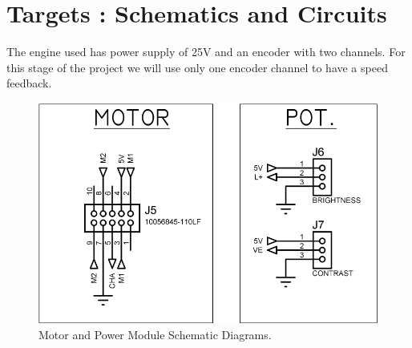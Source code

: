\documentclass[journal]{IEEEtran}
\begin{document}




\section{Targets : Schematics and Circuits}


The engine used \cite{IEEEhowto:motor} has power supply of 25V and an encoder with two channels. For this stage of the project we will use only one encoder channel to have a speed feedback.

\begin{figure}[!ht]%
  \includegraphics[scale=0.41]{motorPot.png}
  \centering
  \caption{Motor and Power Module Schematic Diagrams.}
\end{figure}
\end{document}
